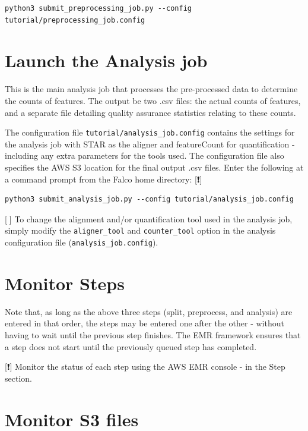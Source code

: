 \documentclass[
]{book}
\begin{document}
\begin{verbatim}
python3 submit_preprocessing_job.py --config tutorial/preprocessing_job.config
\end{verbatim}

\hypertarget{launch-the-analysis-job}{%
\section{Launch the Analysis job}\label{launch-the-analysis-job}}

This is the main analysis job that processes the pre-processed data to determine the counts of features. The output be two .csv files: the actual counts of features, and a separate file detailing quality assurance statistics relating to these counts.

The configuration file \texttt{tutorial/analysis\_job.config} contains the settings for the analysis job with STAR as the aligner and featureCount for quantification - including any extra parameters for the tools used. The configuration file also specifies the AWS S3 location for the final output .csv files. Enter the following at a command prompt from the Falco home directory: {[}❗️{]}

\begin{verbatim}
python3 submit_analysis_job.py --config tutorial/analysis_job.config
\end{verbatim}

{[}🔴{]} To change the alignment and/or quantification tool used in the analysis job, simply modify the \texttt{aligner\_tool} and \texttt{counter\_tool} option in the analysis configuration file (\texttt{analysis\_job.config}).

\hypertarget{monitor-steps}{%
\section{Monitor Steps}\label{monitor-steps}}

Note that, as long as the above three steps (split, preprocess, and analysis) are entered in that order, the steps may be entered one after the other - without having to wait until the previous step finishes. The EMR framework ensures that a step does not start until the previously queued step has completed.

{[}❗️{]} Monitor the status of each step using the AWS EMR console - in the Step section.

\hypertarget{monitor-s3-files}{%
\section{Monitor S3 files}\label{monitor-s3-files}}
\end{document}
